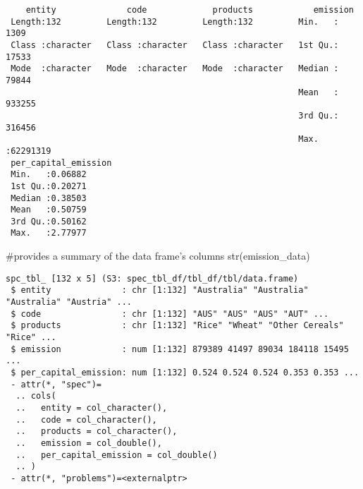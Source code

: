 \documentclass[
  letterpaper,
  DIV=11,
  numbers=noendperiod]{scrartcl}
\newenvironment{Shaded}{\begin{snugshade}}{\end{snugshade}}
\newcommand{\CommentTok}[1]{\textcolor[rgb]{0.37,0.37,0.37}{#1}}
\newcommand{\FunctionTok}[1]{\textcolor[rgb]{0.28,0.35,0.67}{#1}}
\newcommand{\NormalTok}[1]{\textcolor[rgb]{0.00,0.23,0.31}{#1}}
\begin{document}
\begin{verbatim}
    entity              code             products            emission       
 Length:132         Length:132         Length:132         Min.   :    1309  
 Class :character   Class :character   Class :character   1st Qu.:   17533  
 Mode  :character   Mode  :character   Mode  :character   Median :   79844  
                                                          Mean   :  933255  
                                                          3rd Qu.:  316456  
                                                          Max.   :62291319  
 per_capital_emission
 Min.   :0.06882     
 1st Qu.:0.20271     
 Median :0.38503     
 Mean   :0.50759     
 3rd Qu.:0.50162     
 Max.   :2.77977     
\end{verbatim}

\begin{Shaded}
\begin{Highlighting}[]
\CommentTok{\#provides a summary of the data frame’s columns}
\FunctionTok{str}\NormalTok{(emission\_data)}
\end{Highlighting}
\end{Shaded}

\begin{verbatim}
spc_tbl_ [132 x 5] (S3: spec_tbl_df/tbl_df/tbl/data.frame)
 $ entity              : chr [1:132] "Australia" "Australia" "Australia" "Austria" ...
 $ code                : chr [1:132] "AUS" "AUS" "AUS" "AUT" ...
 $ products            : chr [1:132] "Rice" "Wheat" "Other Cereals" "Rice" ...
 $ emission            : num [1:132] 879389 41497 89034 184118 15495 ...
 $ per_capital_emission: num [1:132] 0.524 0.524 0.524 0.353 0.353 ...
 - attr(*, "spec")=
  .. cols(
  ..   entity = col_character(),
  ..   code = col_character(),
  ..   products = col_character(),
  ..   emission = col_double(),
  ..   per_capital_emission = col_double()
  .. )
 - attr(*, "problems")=<externalptr> 
\end{verbatim}
\end{document}

